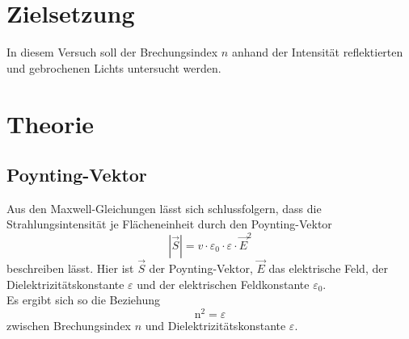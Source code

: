 \section{Zielsetzung}
In diesem Versuch soll der Brechungsindex $n$ anhand der Intensität reflektierten und gebrochenen Lichts untersucht werden.\\ 


\section{Theorie}
\label{sec:Theorie}

\subsection{Poynting-Vektor}
Aus den Maxwell-Gleichungen lässt sich schlussfolgern, dass die 
Strahlungsintensität je Flächeneinheit durch den Poynting-Vektor
\begin{equation*}
    |\vec{S}| = v \cdot \varepsilon_0 \cdot \varepsilon \cdot \vec{E}^2
\end{equation*}
beschreiben lässt.
Hier ist $\vec{S}$ der Poynting-Vektor, $\vec{E}$ das elektrische Feld, der Dielektrizitätskonstante $\varepsilon$ und der 
elektrischen Feldkonstante $\varepsilon_0$.\\
Es ergibt sich so die Beziehung
\begin{equation*}
\mathrm{n}^2 = \varepsilon
\end{equation*}
zwischen Brechungsindex $n$ und Dielektrizitätskonstante $\varepsilon$.\\



